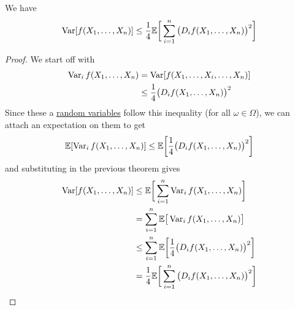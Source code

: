   \begin{corollary}
    \label{thm:bounded-differences-variance-bound}
  We have 
  \begin{equation}
    \operatorname{Var}[ f(X_1, \ldots, X_n)] \leq \frac{1}{4} \mathbb{E} \bigg[ \sum_{i=1}^n \big( D_i f(X_1, \ldots, X_n) \big)^2 \bigg]
  \end{equation}
  \end{corollary}
  \begin{proof}
  We start off with 
  \begin{align*}
      \operatorname{Var}_i f (X_1, \ldots, X_n) & = \operatorname{Var}[ f(X_1, \ldots, X_i, \ldots, X_n)] \\
      & \leq \frac{1}{4} \big( D_i f (X_1, \ldots, X_n)\big)^2 
  \end{align*}
  Since these a \hyperref[prob-def:random-variable]{random variables} follow this inequality (for all $\omega \in \Omega$), we can attach an expectation on them to get 
  \begin{equation}
    \mathbb{E}[\operatorname{Var}_i f (X_1, \ldots, X_n)] \leq \mathbb{E} \bigg[ \frac{1}{4} \big( D_i f (X_1, \ldots, X_n)\big)^2\bigg]
  \end{equation}
  and substituting in the previous theorem gives 
  \begin{align*}
      \operatorname{Var}[f(X_1, \ldots, X_n)] & \leq \mathbb{E} \bigg[ \sum_{i=1}^n \operatorname{Var}_i f(X_1, \ldots, X_n) \bigg] \\
      & = \sum_{i=1}^n \mathbb{E}\big[ \operatorname{Var}_i f(X_1, \ldots, X_n) \big] \\
      & \leq \sum_{i=1}^n \mathbb{E} \bigg[ \frac{1}{4} \big( D_i f (X_1, \ldots, X_n)\big)^2\bigg] \\
      & = \frac{1}{4} \mathbb{E} \bigg[ \sum_{i=1}^n \big( D_i f(X_1, \ldots, X_n) \big)^2 \bigg] 
  \end{align*}
  \end{proof}

  \begin{example}
    \label{ex:random-matrices}

  \end{example}



